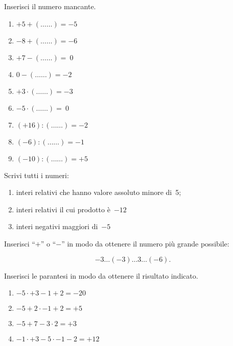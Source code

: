 \begin{esercizio}
Inserisci il numero mancante.

\vspace{-.5em}
 \begin{multicols}{3}
 \begin{enumerate}[noitemsep, label=(\alph*)]
 \item \(+5 + (\ldots\ldots) = -5\)
 \item \(-8 + (\ldots\ldots) = -6\)
 \item \(+7 - (\ldots\ldots) =~0\)
 \item \(0 - (\ldots\ldots) = -2\)
 \item \(+3\cdot (\ldots\ldots) = -3\)
 \item \(-5\cdot (\ldots\ldots) =~0\)
 \item \((+16): (\ldots\ldots) = -2\)
 \item \((-6): (\ldots\ldots) = -1\)
 \item \((-10): (\ldots\ldots) = +5\)
 \end{enumerate}
 \end{multicols}
\end{esercizio}

\begin{esercizio}
 Scrivi tutti i numeri:
 \begin{enumerate}[noitemsep, label=(\alph*)]
 \item interi relativi che hanno valore assoluto minore di~5;
 \item interi relativi il cui prodotto è~\(-12\)
 \item interi negativi maggiori di~\(-5\)
 \end{enumerate}
\end{esercizio}

\begin{esercizio}
Inserisci ``\(+\)'' o ``\(-\)'' in modo da ottenere il numero più grande 
possibile:

\vspace{-.5em}
 \[-3\ldots(-3)\ldots3\ldots(-6).\]
\end{esercizio}

\begin{esercizio}
Inserisci le parantesi in modo da ottenere il risultato indicato.

\vspace{-.5em}
 \begin{multicols}{2}
 \begin{enumerate}[noitemsep, label=(\alph*)]
 \item \(-5 \cdot +3-1+2=-20\)
 \item \(-5+2\cdot-1+2=+5\)
 \item \(-5+7-3\cdot 2=+3\)
 \item \(-1\cdot +3-5\cdot -1-2=+12\)
 \end{enumerate}
 \end{multicols}
\end{esercizio}

